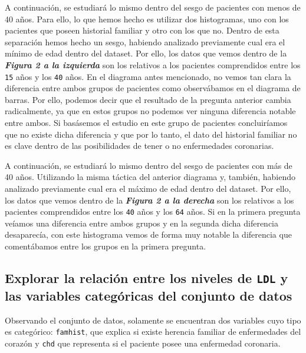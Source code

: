 \documentclass[a4paper, 9pt]{article}
\begin{document}
\vspace{3mm}

A continuación, se estudiará lo mismo dentro del sesgo de pacientes con menos de 40 años. Para ello, lo que hemos hecho es utilizar dos histogramas, uno con los pacientes que poseen historial familiar y otro con los que no. Dentro de esta separación hemos hecho un sesgo, habiendo analizado previamente cual era el mínimo de edad dentro del dataset. Por ello, los datos que vemos dentro de la \textit{\textbf{Figura 2 a la izquierda}} son los relativos a los pacientes comprendidos entre los \texttt{15} años y los \texttt{40} años. En el diagrama antes mencionado, no vemos tan clara la diferencia entre ambos grupos de pacientes como observábamos en el diagrama de barras. Por ello, podemos decir que el resultado de la pregunta anterior cambia radicalmente, ya que en estos grupos no podemos ver ninguna diferencia notable entre ambos. Si basásemos el estudio en este grupo de pacientes concluiríamos que no existe dicha diferencia y que por lo tanto, el dato del historial familiar no es clave dentro de las posibilidades de tener o no enfermedades coronarias.

\vspace{3mm}

A continuación, se estudiará lo mismo dentro del sesgo de pacientes con más de 40 años. Utilizando la misma táctica del anterior diagrama y, también, habiendo analizado previamente cual era el máximo de edad dentro del dataset. Por ello, los datos que vemos dentro de la \textit{\textbf{Figura 2 a la derecha}} son los relativos a los pacientes comprendidos entre los \texttt{40} años y los \texttt{64} años. Si en la primera pregunta veíamos una diferencia entre ambos grupos y en la segunda dicha diferencia desaparecía, con este histograma vemos de forma muy notable la diferencia que comentábamos entre los grupos en la primera pregunta.

\vspace{3mm}

\setcounter{figure}{0}
\setcounter{table}{0}

\subsection{Explorar la relación entre los niveles de \texttt{LDL} y las variables categóricas del conjunto de datos}

Observando el conjunto de datos, solamente se encuentran dos variables cuyo tipo es categórico: \texttt{famhist}, que explica si existe herencia familiar de enfermedades del corazón y \texttt{chd} que representa si el paciente posee una enfermedad coronaria.
\end{document}
